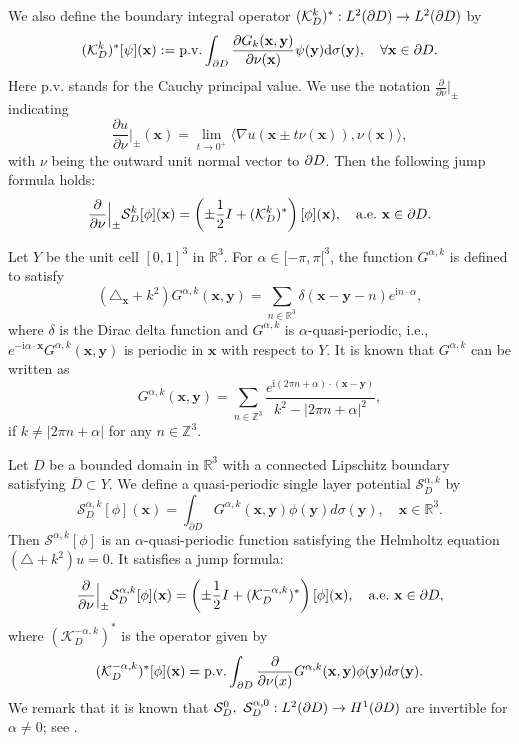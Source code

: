 \documentclass[11pt]{article}
\numberwithin{equation}{section}
\def\bx{{\mathbf{x}}}
\def\by{{\mathbf{y}}}
\def\rd{{\mathrm{d}}}
\def\ri{{\mathrm{i}}}
\newcommand\1{{\ensuremath {\mathds 1} }}
\newcommand{\pd}[2]{\frac{\partial #1}{\partial #2}}
\begin{document}
We also define the boundary integral operator $(\mathcal{K}_{D}^{k})^* : L^2(\partial D) \rightarrow  L^2(\partial D)$ by
$$
	(\mathcal{K}_{D}^{k})^* [\psi](\bx)  := \mbox{p.v.} \int_{\p D } \f{\p G_k(\bx, \by)}{ \p \nu(\bx)} \psi(\by) \rd \sigma(\by), \quad \forall \bx \in \p D.
$$
Here p.v. stands for the Cauchy principal value. 
 We use the notation $ \pd{}{\nu} \Big|_{\pm}$ indicating
$$ \pd{u}{\nu}\Big|_{\pm}(\bx)= \lim_{t \to 0^+} \langle \nabla u(\bx\pm t\nu(\bx)),\nu(\bx) \rangle,$$ 
with $\nu$ being the outward unit normal vector   to $\partial D$. Then the following jump formula holds:
$$ \pd{}{\nu} \Big|_{\pm} \mathcal{S}_D^{k}[\phi](\bx) = \left( \pm \frac{1}{2} I + (\mathcal{K}_D^{k})^* \right)[\phi](\bx),\quad \mbox{a.e.}~\bx\in \p D.$$


Let $Y$ be the unit cell $[0,1]^3$ in $\mathbb{R}^3$. For $\alpha\in [-\pi,\pi[^3$, the function $G^{\alpha, k}$ is defined to satisfy
$$ (\triangle_\bx + k^2) G^{\alpha, k} (\bx,\by) = \sum_{n\in \mathbb{R}^3} \delta(\bx-\by-n) e^{\ri  n\cdot \alpha},$$
where $\delta$ is the Dirac delta function and  $G^{\alpha, k} $ is $\alpha$-quasi-periodic, {i.e.}, $e^{-\ri \alpha\cdot \bx} G^{\alpha, k}(\bx,\by)$ is periodic in $\bx$ with respect to $Y$. It is known that $G^{\alpha, k} $ can be written as
$$ G^{\alpha, k}(\bx,\by) = \sum_{n\in \mathbb{Z}^3} \frac{e^{\ri (2\pi n + \alpha)\cdot (\bx-\by)}}{k^2- |2\pi n + \alpha|^2},$$
if $k \ne |2\pi n + \alpha|$ for any $n\in \mathbb{Z}^3$. 

Let $D$ be a bounded domain in $\mathbb{R}^3$ with a connected Lipschitz boundary satisfying $\overline{D} \subset Y$. We define a quasi-periodic single layer potential $\mathcal{S}_D^{\alpha,k}$ by
$$\mathcal{S}_D^{\alpha,k}[\phi](\bx) = \int_{\partial D} G^{\alpha,k} (\bx,\by) \phi(\by) d\sigma(\by),\quad \bx\in \mathbb{R}^3.$$
Then $\mathcal{S}^{\alpha,k}[\phi]$ is an $\alpha$-quasi-periodic function satisfying the Helmholtz equation $(\triangle + k^2)u=0$. It satisfies a jump formula:
$$ \pd{}{\nu} \Big|_{\pm} \mathcal{S}_D^{\alpha,k}[\phi](\bx) = \left( \pm \frac{1}{2} I +( \mathcal{K}_D^{-\alpha,k} )^*\right)[\phi](\bx),\quad \mbox{a.e.}~\bx\in \p D,$$
where $(\mathcal{K}_D^{-\alpha,k})^*$ is the operator given by
$$ (\mathcal{K}_D^{-\alpha, k} )^*[\phi](\bx)= \mbox{p.v.} \int_{\p D} \pd{}{\nu(x)} G^{\alpha,k}(\bx,\by) \phi(\by) d\sigma(\by).$$
We remark that it is known that $\mathcal{S}_D^{0},~\mathcal{S}_D^{\alpha,0} : L^2(\partial D) \rightarrow H^1(\partial D)$ are invertible for $\alpha \ne 0$; see \cite{Ammari2009_book}. 

\end{document}
